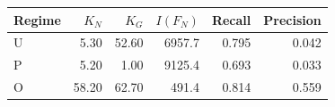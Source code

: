 \begin{tabular}{lrrrrr}\toprule
	Regime & $K_N$ & $K_G$ & $I(F_N)$ & Recall & Precision\\\midrule
	U & 5.30 & 52.60 & 6957.7 & 0.795 & 0.042\\
	P & 5.20 & 1.00 & 9125.4 & 0.693 & 0.033\\
	O & 58.20 & 62.70 & 491.4 & 0.814 & 0.559\\
	\bottomrule
\end{tabular}
